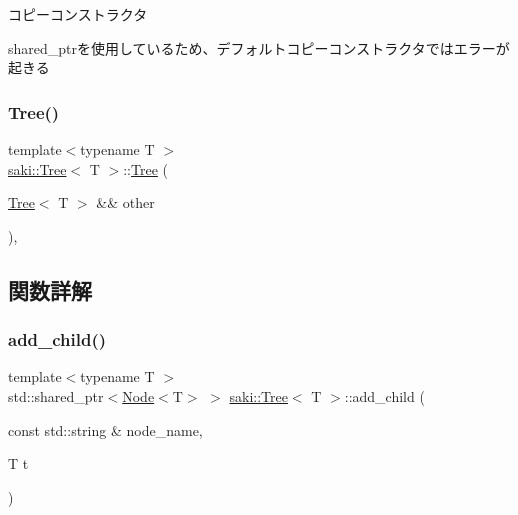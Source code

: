 コピーコンストラクタ 

shared\+\_\+ptrを使用しているため、デフォルトコピーコンストラクタではエラーが起きる \mbox{\label{classsaki_1_1_tree_ad26ec9d86d0ed3f360c88ea4342b726f}} 
\subsubsection{\texorpdfstring{Tree()}{Tree()}\hspace{0.1cm}{\footnotesize\ttfamily [4/4]}}
{\footnotesize\ttfamily template$<$typename T $>$ \\
\mbox{\hyperlink{classsaki_1_1_tree}{saki\+::\+Tree}}$<$ T $>$\+::\mbox{\hyperlink{classsaki_1_1_tree}{Tree}} (\begin{DoxyParamCaption}\item[{\mbox{\hyperlink{classsaki_1_1_tree}{Tree}}$<$ T $>$ \&\&}]{other }\end{DoxyParamCaption})\hspace{0.3cm}{\ttfamily [inline]}, {\ttfamily [noexcept]}}



\subsection{関数詳解}
\mbox{\label{classsaki_1_1_tree_aa0f905a290a69becb68388d7bbfd9e9f}} 
\subsubsection{\texorpdfstring{add\+\_\+child()}{add\_child()}}
{\footnotesize\ttfamily template$<$typename T $>$ \\
std\+::shared\+\_\+ptr$<$\mbox{\hyperlink{classsaki_1_1_node}{Node}}$<$T$>$ $>$ \mbox{\hyperlink{classsaki_1_1_tree}{saki\+::\+Tree}}$<$ T $>$\+::add\+\_\+child (\begin{DoxyParamCaption}\item[{const std\+::string \&}]{node\+\_\+name,  }\item[{T}]{t }\end{DoxyParamCaption})\hspace{0.3cm}{\ttfamily [inline]}}



